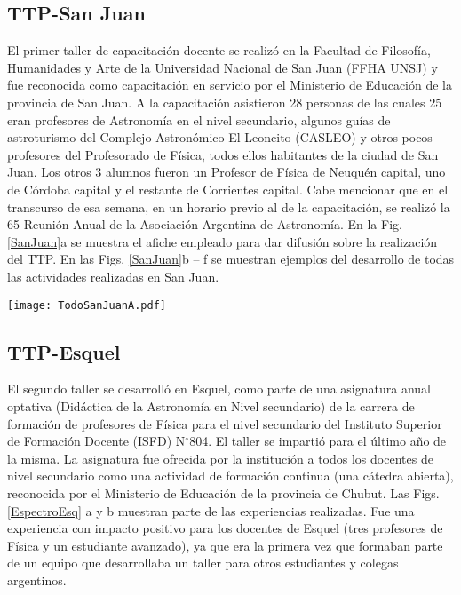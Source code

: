 \documentclass[baaa]{baaa}
\begin{document}
\subsection{TTP-San Juan}
El primer taller de capacitaci\'on docente se realiz\'o en la Facultad de Filosof\'ia, Humanidades y Arte de la Universidad Nacional de San Juan (FFHA UNSJ) y fue reconocida como capacitaci\'on en servicio por el Ministerio de Educaci\'on de la provincia de San Juan.  A la capacitaci\'on asistieron 28 personas de las cuales 25 eran profesores de Astronom\'ia en el nivel secundario, algunos gu\'ias de astroturismo del Complejo Astron\'omico El Leoncito (CASLEO) y otros pocos profesores del Profesorado de F\'isica, todos ellos habitantes de la ciudad de San Juan. Los otros 3 alumnos fueron un Profesor de F\'isica de Neuqu\'en capital, uno de C\'ordoba capital y el restante de Corrientes capital. Cabe mencionar que en el transcurso de esa semana, en un horario previo al de la capacitaci\'on, se realiz\'o la 65 Reuni\'on Anual de la Asociaci\'on Argentina de Astronom\'ia. En la Fig. \ref{SanJuan}a se muestra el afiche empleado para dar difusi\'on sobre la realizaci\'on del TTP. En las Figs. \ref{SanJuan}b -- f se muestran ejemplos del desarrollo de todas las actividades realizadas en San Juan. 

\begin{figure*}
\centering
\texttt{[image: TodoSanJuanA.pdf]}
\caption{a) Afiche de difusi\'on del TTP realizado en San Juan capital. b) Desarrollo de una clase. c) Trabajo con el fot\'ometro de Bunsen (idea tomada de \citet{Garcia2020}). d) Espectro de fuente de luz artificial. e) Espectroscopio construido en clase (idea tomada de \citet{Garcia2018}). f) Observaci\'on del Sol efectuada por sus c\'amaras oscuras.}
\label{SanJuan}
\end{figure*}

\subsection{TTP-Esquel}
El segundo taller se desarroll\'o en Esquel, como parte de una asignatura anual optativa (Did\'actica de la Astronom\'ia en Nivel secundario) de la carrera de formaci\'on de profesores de F\'isica para el nivel secundario del Instituto Superior de Formaci\'on Docente (ISFD) N$^{\circ}$804. El taller se imparti\'o para el \'ultimo a\~no de la misma. La asignatura fue ofrecida por la instituci\'on a todos los docentes de nivel secundario como una actividad de formaci\'on continua (una c\'atedra abierta), reconocida por el Ministerio de Educaci\'on de la provincia de Chubut. Las Figs. \ref{EspectroEsq} a y b muestran parte de las experiencias realizadas. Fue una experiencia con impacto positivo para los docentes de Esquel (tres profesores de F\'isica y un estudiante avanzado), ya que era la primera vez que formaban parte de un equipo que desarrollaba un taller para otros estudiantes y colegas argentinos.
\end{document}
